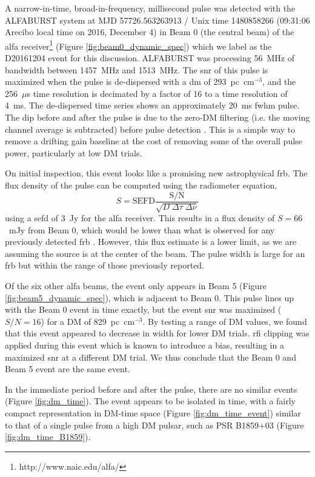 \documentclass[a4paper,fleqn,usenatbib]{mnras}
\begin{document}
A narrow-in-time, broad-in-frequency, millisecond pulse was detected with the
ALFABURST system at MJD 57726.563263913 / Unix time 1480858266 (09:31:06 Arecibo
local time on 2016, December 4) in Beam 0 (the central beam) of the \gls{alfa}
receiver\footnote{http://www.naic.edu/alfa/} (Figure
\ref{fig:beam0_dynamic_spec}) which we label as the D20161204 event for this
discussion. ALFABURST was processing 56~MHz of bandwidth between 1457~MHz and
1513~MHz. The \gls{snr} of this pulse is maximized when the pulse is
de-dispersed with a \gls{dm} of 293~pc~cm$^{-3}$, and the 256~$\mu$s time
resolution is decimated by a factor of 16 to a time resolution of 4~ms. The
de-dispersed time series shows an approximately 20~ms \gls{fwhm} pulse.  The dip
before and after the pulse is due to the zero-DM filtering (i.e. the moving
channel average is subtracted) before pulse detection
\citep{2009MNRAS.395..410E}. This is a simple way to remove a drifting gain
baseline at the cost of removing some of the overall pulse power, particularly
at low DM trials.

On initial inspection, this event looks like a promising new astrophysical
\gls{frb}. The flux density of the pulse can be computed using the radiometer
equation,
%
$$
S = \textrm{SEFD} \frac{\textrm{S/N}}{\sqrt{D \; \Delta \tau \;
\Delta \nu}}
$$
%
using a \gls{sefd} of 3~Jy for the \gls{alfa} receiver. This results in a flux
density of \mbox{$S = 66$}~mJy from Beam 0, which would be lower than what is
observed for any previously detected \gls{frb} \citep{2016PASA...33...45P}.
However, this flux estimate is a lower limit, as we are assuming the source is
at the center of the beam. The pulse width is large for an \gls{frb} but within
the range of those previously reported.

Of the six other \gls{alfa} beams, the event only appears in Beam 5 (Figure
\ref{fig:beam5_dynamic_spec}), which is adjacent to Beam 0.  This pulse lines up
with the Beam 0 event in time exactly, but the event \gls{snr} was maximized
($S/N=16$) for a DM of 829~pc~cm$^{-3}$. By testing a range of DM values, we
found that this event appeared to decrease in width for lower DM trials.
\gls{rfi} clipping was applied during this event which is known to introduce a
bias, resulting in a maximized \gls{snr} at a different DM trial.  We thus
conclude that the Beam 0 and Beam 5 event are the same event.

In the immediate period before and after the pulse, there are no similar events
(Figure \ref{fig:dm_time}). The event appears to be isolated in time, with a
fairly compact representation in DM-time space (Figure \ref{fig:dm_time_event})
similar to that of a single pulse from a high DM pulsar, such as PSR B1859+03
(Figure \ref{fig:dm_time_B1859}).
\end{document}
